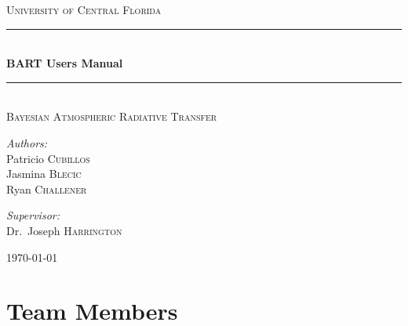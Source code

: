 \documentclass[letterpaper, 12pt]{article}
\begin{document}
\begin{titlepage}
\begin{center}

\textsc{\LARGE University of Central Florida}\\[1.5cm]

\rule{\linewidth}{0.5mm} \\[0.4cm]
{ \huge \bfseries BART Users Manual \\[0.4cm] }
\rule{\linewidth}{0.5mm} \\[1.0cm]

\textsc{\Large Bayesian Atmospheric Radiative Transfer}\\[1.5cm]

\noindent
\begin{minipage}{0.4\textwidth}
\begin{flushleft}
\large
\emph{Authors:} \\
Patricio \textsc{Cubillos} \\
Jasmina  \textsc{Blecic}   \\
Ryan     \textsc{Challener} \\
\end{flushleft}
\end{minipage}%
\begin{minipage}{0.4\textwidth}
\begin{flushright} \large
\emph{Supervisor:} \\
Dr.~Joseph \textsc{Harrington}
\end{flushright}
\end{minipage}
\vfill

{\large \today}

\end{center}
\end{titlepage}

\tableofcontents
\newpage

\section{Team Members}
\label{sec:team}
\end{document}
